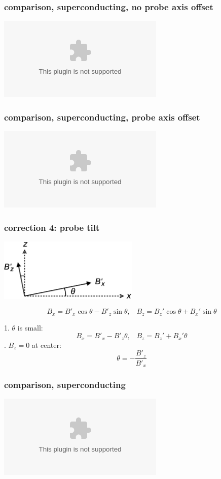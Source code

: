\documentclass[handout]{beamer}
\newcommand{\pyplot}{\includegraphics[width=\textwidth, trim=60px 60px 60px 40px]}
\begin{document}
\begin{frame}
\begin{columns}
    \end{columns}

\end{frame}

\begin{frame}
\frametitle{comparison, superconducting, no probe axis offset}

    \begin{center}
    \pyplot{../savedplots/endcapThreeNoOffset.eps}
    \end{center}

\end{frame}

\begin{frame}
\frametitle{comparison, superconducting, probe axis offset}

    \begin{center}
    \pyplot{../savedplots/endcapThreeOffset.eps}
    \end{center}

\end{frame}

\begin{frame}
\frametitle{correction 4: probe tilt}
    
    \begin{center}
        \includegraphics[width=0.5\textwidth]{figures/probe_tilt.eps}
    \end{center} \pause
    \begin{equation}
        B_x = B'_x \cos\theta - B'_z \sin\theta, \;\;\; B_z = B_z' \cos\theta + B_x' \sin\theta
    \end{equation}

    \pause

    \bigskip

    1. $\theta$ is small: \pause
    \begin{equation*}
        B_x = B'_x - B'_z \theta, \;\;\; B_z = B_z' + B_x' \theta
    \end{equation*} . $B_z = 0$ at center: \pause
    \begin{equation*}
        \theta = -\frac{B'_z}{B'_x}
    \end{equation*}

\end{frame}

\begin{frame}
\frametitle{comparison, superconducting}

    \begin{center}
    \pyplot{../savedplots/w5_comp.eps}
    \end{center}

\end{frame}
\end{document}
